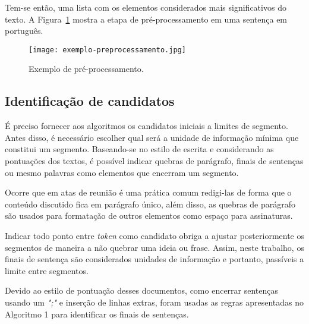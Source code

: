 	



Tem-se então, uma lista com os elementos considerados mais significativos do texto. A Figura~\ref{fig:exemplopreprocessamento} mostra a etapa de pré-processamento em uma sentença em português.
	



  \begin{figure}[!h]
	\centering
	\texttt{[image: exemplo-preprocessamento.jpg]}
	\caption{Exemplo de pré-processamento.}
	\label{fig:exemplopreprocessamento}
  \end{figure}






\subsection{Identificação de candidatos}
	\label{subsec:indentificacaosentencas}
	
	
	
	É preciso fornecer aos algoritmos os candidatos iniciais a limites de segmento. Antes disso, é necessário escolher qual será a unidade de informação mínima que constitui um segmento. Baseando-se no estilo de escrita e considerando as pontuações dos textos, é possível indicar quebras de parágrafo, finais de sentenças ou mesmo palavras como elementos que encerram um segmento. 

	Ocorre que em atas de reunião é uma prática comum redigi-las de forma que o conteúdo discutido fica em parágrafo único, além disso, as quebras de parágrafo são usados para formatação de outros elementos como espaço para assinaturas. 

	Indicar todo ponto entre \textit{token} como candidato obriga a ajustar posteriormente os segmentos de maneira a não quebrar uma ideia ou frase. Assim, neste trabalho, os finais de sentença são considerados unidades de informação e portanto, passíveis a limite entre segmentos. 
	
	Devido ao estilo de pontuação desses documentos, como encerrar sentenças usando um \textit{";"} e inserção de linhas extras, foram usadas as regras apresentadas no Algoritmo 1 para identificar os finais de sentenças.  


